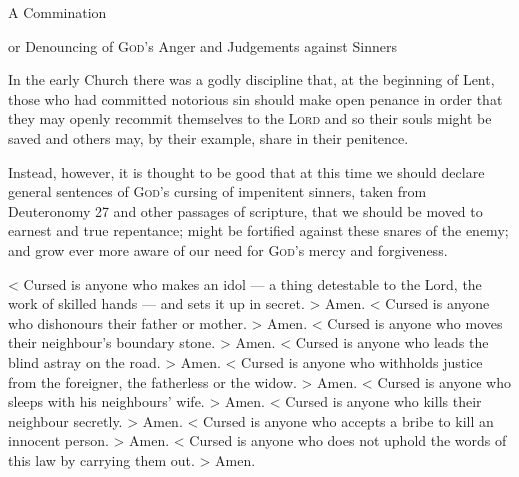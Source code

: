\documentclass[a5paper]{liturgy}
\begin{document}
\begin{center}
  \huge
  A Commination

  \large
  or Denouncing of \textsc{God}'s Anger and Judgements against Sinners
\end{center}

\begin{leader}
  In the early Church there was a godly discipline that, at the beginning of Lent, those who had committed notorious sin should make open penance in order that they may openly recommit themselves to the \textsc{Lord} and so their souls might be saved and others may, by their example, share in their penitence.

  Instead, however, it is thought to be good that at this time we should declare general sentences of \textsc{God}'s cursing of impenitent sinners, taken from Deuteronomy 27 and other passages of scripture, that we should be moved to earnest and true repentance; might be fortified against these snares of the enemy; and grow ever more aware of our need for \textsc{God}'s mercy and forgiveness.
\end{leader}

\begin{responses}
  < Cursed is anyone who makes an idol --- a thing detestable to the Lord, the work of skilled hands --- and sets it up in secret.
  > Amen.
  < Cursed is anyone who dishonours their father or mother.
  > Amen.
  < Cursed is anyone who moves their neighbour's boundary stone.
  > Amen.
  < Cursed is anyone who leads the blind astray on the road.
  > Amen.
  < Cursed is anyone who withholds justice from the foreigner, the fatherless or the widow.
  > Amen.
  < Cursed is anyone who sleeps with his neighbours' wife.
  > Amen.
  < Cursed is anyone who kills their neighbour secretly.
  > Amen.
  < Cursed is anyone who accepts a bribe to kill an innocent person.
  > Amen.
  < Cursed is anyone who does not uphold the words of this law by carrying them out.
> Amen.\end{responses}
\end{document}
